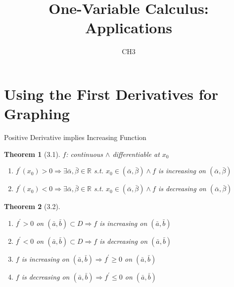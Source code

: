 \documentclass[final]{beamer}
\author[조남운]{\mail}
\title{One-Variable Calculus: Applications}
\subtitle{CH3}
\newtheorem{thm}{Theorem}
\begin{document}
	\maketitle


\section{Using the First Derivatives for Graphing} %
\label{sec:using_the_first_derivative_for_graphing}

\begin{frame}[t]{Positive Derivative implies Increasing Function}
	\begin{thm}[3.1]
		$f$: continuous $\land$ differentiable at $x_0$
		\begin{enumerate}
			\item $f^\prime (x_0)>0 \Rightarrow \exists \bar\alpha,\bar\beta\in\mathbb{R} $ s.t. $x_0\in(\bar\alpha,\bar\beta)\land f$ is increasing on $(\bar\alpha,\bar\beta)$
			\item $f^\prime (x_0)<0 \Rightarrow \exists \bar\alpha,\bar\beta\in\mathbb{R} $ s.t. $x_0\in(\bar\alpha,\bar\beta)\land f$ is decreasing on $(\bar\alpha,\bar\beta)$
		\end{enumerate}
	\end{thm}
	\begin{thm}
		[3.2]
		\begin{enumerate}
			\item $f^\prime>0$ on $(\bar a, \bar b)\subset D \Rightarrow f$ is increasing on $(\bar a,\bar b)$
			\item $f^\prime<0$ on $(\bar a, \bar b)\subset D \Rightarrow f$ is decreasing on $(\bar a,\bar b)$
			\item $f$ is increasing on $(\bar a, \bar b) \Rightarrow f^\prime \ge 0$ on $(\bar a, \bar b)$
			\item $f$ is decreasing on $(\bar a, \bar b) \Rightarrow f^\prime \le 0$ on $(\bar a, \bar b)$
		\end{enumerate}
	\end{thm}
\end{frame}
\end{document}
